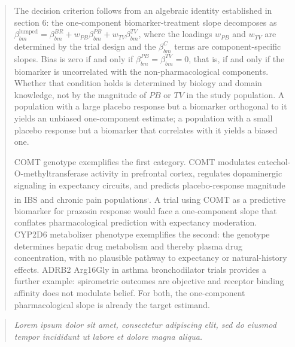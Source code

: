 \documentclass[
  11pt,
]{article}
\newenvironment{rgt}{%
  \begin{quote}\small\itshape\color[RGB]{20,60,160}}{%
  \end{quote}}
\newenvironment{orig}{%
  \begin{quote}\normalsize\color[gray]{0.55}}{%
  \end{quote}}
\begin{document}
\begin{orig}
The decision criterion follows from an algebraic identity
established in section 6: the one-component biomarker-treatment slope
decomposes as \(\beta_{bm}^{\text{lumped}} = \beta_{bm}^{BR} +
w_{PB}\beta_{bm}^{PB} + w_{TV}\beta_{bm}^{TV}\), where the
loadings \(w_{PB}\) and \(w_{TV}\) are determined by the trial
design and the \(\beta_{bm}^{C}\) terms are component-specific
slopes. Bias is zero if and only if \(\beta_{bm}^{PB} =
\beta_{bm}^{TV} = 0\), that is, if and only if the biomarker is
uncorrelated with the non-pharmacological components. Whether
that condition holds is determined by biology and domain
knowledge, not by the magnitude of \(PB\) or \(TV\) in the study
population. A population with a large placebo response but a
biomarker orthogonal to it yields an unbiased one-component estimate;
a population with a small placebo response but a biomarker that
correlates with it yields a biased one.

COMT genotype exemplifies the first category. COMT modulates
catechol-O-methyltransferase activity in prefrontal cortex,
regulates dopaminergic signaling in expectancy circuits, and
predicts placebo-response magnitude in IBS and chronic pain
populations\textsuperscript{,}. A trial using COMT
as a predictive biomarker for prazosin response would face a
one-component slope that conflates pharmacological prediction with
expectancy moderation. CYP2D6 metabolizer phenotype exemplifies
the second: the genotype determines hepatic drug metabolism and
thereby plasma drug concentration, with no plausible pathway
to expectancy or natural-history effects. ADRB2 Arg16Gly in
asthma bronchodilator trials provides a further example:
spirometric outcomes are objective and receptor binding affinity
does not modulate belief. For both, the one-component pharmacological
slope is already the target estimand.

\end{orig}

\begin{rgt}
Lorem ipsum dolor sit amet, consectetur adipiscing elit, sed do eiusmod tempor incididunt ut labore et dolore magna aliqua.

\end{rgt}
\end{document}
